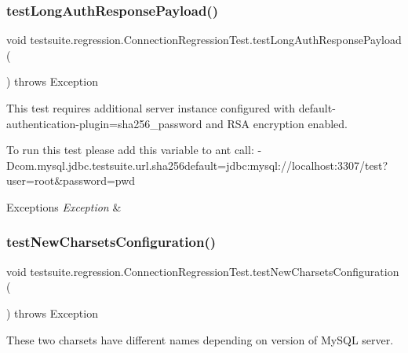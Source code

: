\subsubsection{\texorpdfstring{test\+Long\+Auth\+Response\+Payload()}{testLongAuthResponsePayload()}}
{\footnotesize\ttfamily void testsuite.\+regression.\+Connection\+Regression\+Test.\+test\+Long\+Auth\+Response\+Payload (\begin{DoxyParamCaption}{ }\end{DoxyParamCaption}) throws Exception}

This test requires additional server instance configured with default-\/authentication-\/plugin=sha256\+\_\+password and R\+SA encryption enabled.

To run this test please add this variable to ant call\+: -\/\+Dcom.\+mysql.\+jdbc.\+testsuite.\+url.\+sha256default=jdbc\+:mysql\+://localhost\+:3307/test?user=root\&password=pwd


\begin{DoxyExceptions}{Exceptions}
{\em Exception} & \\
\hline
\end{DoxyExceptions}
\mbox{\label{classtestsuite_1_1regression_1_1_connection_regression_test_a3e4f6c5f1867be7b76a82e9c0344cc5c}} 
\subsubsection{\texorpdfstring{test\+New\+Charsets\+Configuration()}{testNewCharsetsConfiguration()}}
{\footnotesize\ttfamily void testsuite.\+regression.\+Connection\+Regression\+Test.\+test\+New\+Charsets\+Configuration (\begin{DoxyParamCaption}{ }\end{DoxyParamCaption}) throws Exception}

These two charsets have different names depending on version of My\+S\+QL server.


